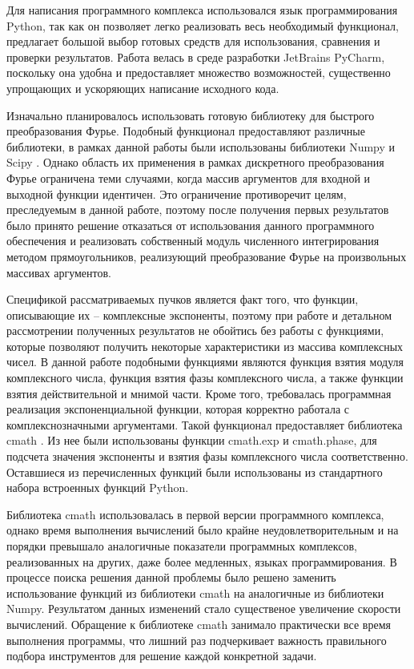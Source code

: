 {
	Для написания программного комплекса использовался язык
программирования  Python, так как он позволяет легко реализовать весь
необходимый функционал, предлагает большой выбор готовых средств для
использования, сравнения и проверки результатов. Работа велась в среде
разработки JetBrains PyCharm, поскольку она удобна и предоставляет
множество возможностей, существенно упрощающих и ускоряющих написание
исходного кода.

	Изначально планировалось использовать готовую библиотеку для
быстрого преобразования Фурье. Подобный функционал предоставляют
различные библиотеки, в рамках данной работы были использованы
библиотеки Numpy и Scipy \cite{np}\hspace{-0.1cm}. Однако область их применения в рамках
дискретного преобразования Фурье ограничена теми случаями, когда массив
аргументов для входной и выходной функции идентичен. Это ограничение противоречит целям, преследуемым в данной работе, поэтому после получения
первых результатов было принято решение отказаться от использования
данного программного обеспечения и реализовать собственный модуль
численного интегрирования методом прямоугольников, реализующий
преобразование Фурье на произвольных массивах аргументов.
			
	Спецификой рассматриваемых пучков является факт того, что функции,
описывающие их – комплексные экспоненты, поэтому при работе и детальном
рассмотрении полученных результатов не обойтись без работы с функциями,
которые позволяют получить некоторые характеристики из массива
комплексных чисел. В данной работе подобными функциями являются
функция взятия модуля комплексного числа, функция взятия фазы
комплексного числа, а также функции взятия действительной и мнимой части.
Кроме того, требовалась программная реализация экспоненциальной функции,
которая корректно работала с комплекснозначными аргументами. Такой функционал предоставляет библиотека cmath \cite{cmath}. Из нее были использованы
функции cmath.exp и cmath.phase, для подсчета значения экспоненты и взятия
фазы комплексного числа соответственно. Оставшиеся из перечисленных
функций были использованы из стандартного набора встроенных функций
Python. 

Библиотека cmath использовалась в первой версии программного комплекса, однако время выполнения вычислений было крайне неудовлетворительным и на порядки превышало аналогичные показатели программных комплексов, реализованных на других, даже более медленных, языках программирования. В процессе поиска решения данной проблемы было решено заменить использование функций из библиотеки cmath на аналогичные из библиотеки Numpy. Результатом данных изменений стало существеное увеличение скорости вычислений. Обращение к библиотеке cmath занимало практически все время выполнения программы, что лишний раз подчеркивает важность правильного подбора инструментов для решение каждой конкретной задачи. 

}
